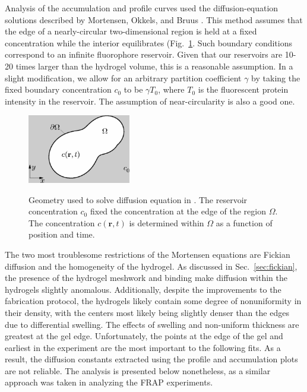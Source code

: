 Analysis of the accumulation and profile curves used the diffusion-equation solutions described by Mortensen, Okkels, and Bruus \cite{mortensen06}.  This method assumes that the edge of  a nearly-circular two-dimensional region is held at a fixed concentration while the interior equilibrates (Fig.~\ref{fig:mortensen}.  Such boundary conditions correspond to an infinite fluorophore reservoir.  Given that our reservoirs are 10-20 times larger than the hydrogel volume, this is a reasonable assumption.  In a slight modification, we allow for an arbitrary partition coefficient $\gamma$ by taking the fixed boundary concentration $c_0$ to be $\gamma T_0$, where $T_0$ is the fluorescent protein intensity in the reservoir.  The assumption of near-circularity is also a good one.

\begin{figure}
\caption{Geometry used to solve diffusion equation in \cite{mortensen06}.  The reservoir concentration $c_0$ fixed the concentration at the edge of the region $\Omega$.  The concentration $c(\mathbf{r},t)$ is determined within $\Omega$ as a function of position and time.}
\centering
\includegraphics[width=0.4\textwidth]{figs/ch04/mortensen}
\label{fig:mortensen}
\end{figure}

The two most troublesome restrictions of the Mortensen equations are Fickian diffusion and the homogeneity of the hydrogel.  As discussed in Sec.~\ref{sec:fickian}, the presence of the hydrogel meshwork and binding make diffusion within the hydrogels slightly anomalous.  Additionally, despite the improvements to the fabrication protocol, the hydrogels likely contain some degree of nonuniformity in their density, with the centers most likely being slightly denser than the edges due to differential swelling.  The effects of swelling and non-uniform thickness are greatest at the gel edge.  Unfortunately, the points at the edge of the gel and earliest in the experiment are the most important to the following fits.  As a result, the diffusion constants extracted using the profile and accumulation plots are not reliable.  The analysis is presented below nonetheless, as a similar approach was taken in analyzing the FRAP experiments.


